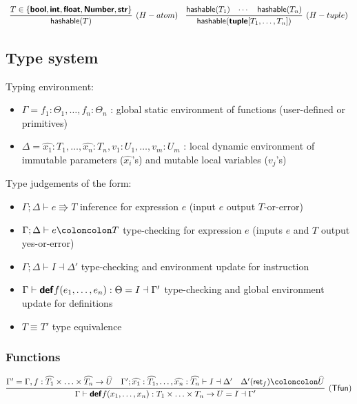 \documentclass[a4paper]{article}
\newcommand{\kw}[1]{\textsf{\textbf{#1}}}
\newcommand{\colcol}{\coloncolon}
\newcommand{\yield}{\Rrightarrow}
\newcommand{\fun}[1]{\mathsf{#1}}
\begin{document}
$$\begin{array}{cc}
\infer[(H-atom)]{\fun{hashable}(T)}{T \in \{\kw{bool},\kw{int},\kw{float},\kw{Number},\kw{str}\}}
&
\infer[(H-tuple)]{\fun{hashable}(\kw{tuple}[T_1,\ldots,T_n])}{\fun{hashable}(T_1) & \cdots & \fun{hashable}(T_n)}
\end{array}
$$

\subsection{Type system}

Typing environment:

\begin{itemize}
  \item $\Gamma = f_1:\Theta_1,\ldots,f_n:\Theta_n$ : global static environment of functions (user-defined or primitives)
  \item $\Delta = \widehat{x_1}:T_1,\ldots,\widehat{x_n}:T_n,v_1:U_1,\ldots,v_m:U_m$ : local dynamic environment of immutable parameters ($\widehat{x_i}$'s) and mutable local variables ($v_j$'s)
\end{itemize}

Type judgements of the form:

\begin{itemize}
\item $\Gamma;\Delta \vdash e \yield T$ \quad inference for expression $e$ (input $e$ output $T$-or-error)
\item $\Gamma;\Delta \vdash e \colcol T$ \quad type-checking for expression $e$ (inputs $e$ and $T$ output yes-or-error)
\item $\Gamma;\Delta \vdash I \dashv \Delta'$ \quad type-checking and environment update for instruction
\item $\Gamma \vdash \kw{def} f(e_1,\ldots,e_n) : \Theta = I \dashv \Gamma'$ \quad type-checking and global environment update for definitions
\item $T \equiv T'$ \quad type equivalence
\end{itemize}

\subsubsection{Functions}

$$
\infer[(\fun{Tfun})]{\Gamma \vdash \kw{def} f(x_1,\ldots,x_n) : T_1 \times \ldots \times T_n \rightarrow U = I \dashv \Gamma'}
{\Gamma'=\Gamma,f:\widehat{T_1}\times \ldots \times \widehat{T_n}\rightarrow \widehat{U} & \Gamma';\widehat{x_1}:\widehat{T_1},\ldots,\widehat{x_n}:\widehat{T_n} \vdash I \dashv \Delta' & \Delta'(\fun{ret}_f) \colcol \widehat{U}}
$$
\end{document}
